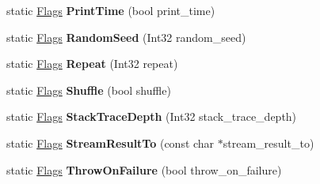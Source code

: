 \begin{DoxyCompactItemize}
static \mbox{\hyperlink{structtesting_1_1_flags}{Flags}} {\bfseries Print\+Time} (bool print\+\_\+time)
\item 
\mbox{\label{structtesting_1_1_flags_a695cd8b8ab44df5eaa371bacded78c05}} 
static \mbox{\hyperlink{structtesting_1_1_flags}{Flags}} {\bfseries Random\+Seed} (Int32 random\+\_\+seed)
\item 
\mbox{\label{structtesting_1_1_flags_a19d47e87d77a18ef4fa8a85b74e25956}} 
static \mbox{\hyperlink{structtesting_1_1_flags}{Flags}} {\bfseries Repeat} (Int32 repeat)
\item 
\mbox{\label{structtesting_1_1_flags_a19ddbbaed61bda44a1940333b7c5a469}} 
static \mbox{\hyperlink{structtesting_1_1_flags}{Flags}} {\bfseries Shuffle} (bool shuffle)
\item 
\mbox{\label{structtesting_1_1_flags_a16b01d8bcceaa9fa8211fd24faa75b5a}} 
static \mbox{\hyperlink{structtesting_1_1_flags}{Flags}} {\bfseries Stack\+Trace\+Depth} (Int32 stack\+\_\+trace\+\_\+depth)
\item 
\mbox{\label{structtesting_1_1_flags_a9cf0f64310b28eadbbfbb35584ebfc71}} 
static \mbox{\hyperlink{structtesting_1_1_flags}{Flags}} {\bfseries Stream\+Result\+To} (const char $\ast$stream\+\_\+result\+\_\+to)
\item 
\mbox{\label{structtesting_1_1_flags_ad856df862414ed0dadf80b5e03829cc7}} 
static \mbox{\hyperlink{structtesting_1_1_flags}{Flags}} {\bfseries Throw\+On\+Failure} (bool throw\+\_\+on\+\_\+failure)
\end{DoxyCompactItemize}
